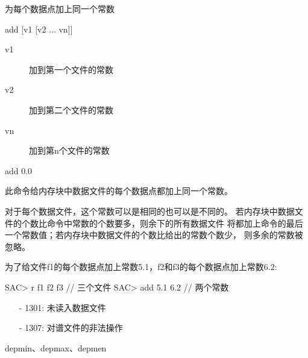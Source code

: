 \label{cmd:add}

为每个数据点加上同一个常数

\begin{SACSTX}
add [v1 [v2 ... vn]]
\end{SACSTX}

\begin{description}
\item [v1]  加到第一个文件的常数
\item [v2]  加到第二个文件的常数
\item [vn]  加到第n个文件的常数
\end{description}

\begin{SACDFT}
add 0.0
\end{SACDFT}

此命令给内存块中数据文件的每个数据点都加上同一个常数。

对于每个数据文件，这个常数可以是相同的也可以是不同的。
若内存块中数据文件的个数比命令中常数的个数要多，则余下的所有数据文件
将都加上命令的最后一个常数值；若内存块中数据文件的个数比给出的常数个数少，
则多余的常数被忽略。

为了给文件f1的每个数据点加上常数5.1，f2和f3的每个数据点加上常数6.2:
\begin{SACCode}
SAC> r f1 f2 f3         // 三个文件
SAC> add 5.1 6.2        // 两个常数
\end{SACCode}

\begin{itemize}
\item[-]1301: 未读入数据文件
\item[-]1307: 对谱文件的非法操作
\end{itemize}

depmin、depmax、depmen
